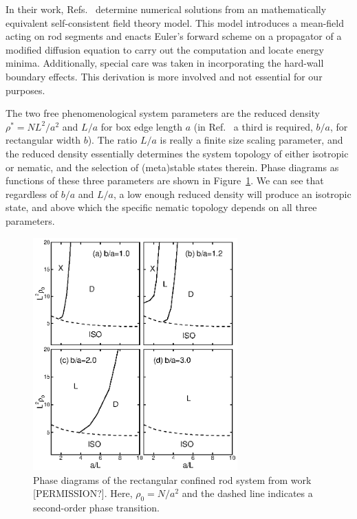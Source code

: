 In their work, Refs.\ \cite{chen2013rods,yao} determine numerical solutions from an mathematically equivalent self-consistent field theory model.  This model introduces a mean-field acting on rod segments and enacts Euler's forward scheme on a propagator of a modified diffusion equation to carry out the computation and locate energy minima. Additionally, special care was taken in incorporating the hard-wall boundary effects. This derivation is more involved and not essential for our purposes.

The two free phenomenological system parameters are the reduced density $\rho^* = NL^2/a^2$ and $L/a$ for box edge length $a$ \cite{chen2016theory}(in Ref.\ \cite{yao} a third is required, $b/a$, for rectangular width $b$).
The ratio $L/a$ is really a finite size scaling parameter, and the reduced density essentially determines the system topology of either isotropic or nematic, and the selection of (meta)stable states therein. 
Phase diagrams as functions of these three parameters are shown in Figure\ \ref{fig:phasediagram}. We can see that regardless of $b/a$ and $L/a$, a low enough reduced density will produce an isotropic state, and above which the specific nematic topology depends on all three parameters.

\begin{figure}
	\centering
	\includegraphics[width=0.7\textwidth]{./figs/ABCD.eps}
	\caption{Phase diagrams of the rectangular confined rod system from work \cite{yao} [PERMISSION?]. Here, $\rho_0 = N/a^2$ and the dashed line indicates a second-order phase transition.}
	\label{fig:phasediagram}
\end{figure}

